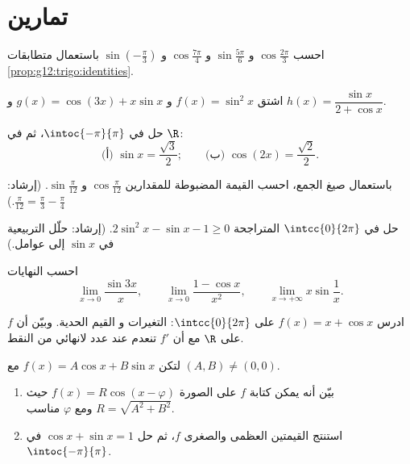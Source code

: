 \section{تمارين}

\begin{exercise}[$\star$]\label{exo:g12:trigo:1}
احسب $\cos\frac{2\pi}{3}$ و $\sin\frac{5\pi}{6}$ و $\cos\frac{7\pi}{4}$ و
$\sin\left(-\frac{\pi}{3}\right)$ باستعمال متطابقات
\cref{prop:g12:trigo:identities}.
\end{exercise}

\begin{exercise}[$\star$]\label{exo:g12:trigo:2}
اشتق $f(x) = \sin^2 x$ و $g(x) = \cos(3x) + x\sin x$ و
$h(x) = \dfrac{\sin x}{2 + \cos x}$.
\end{exercise}

\begin{exercise}[$\star$]\label{exo:g12:trigo:3}
حل في $\intoc{-\pi}{\pi}$، ثم في $\R$:
\[
\text{(أ) } \sin x = \frac{\sqrt3}{2};
\qquad
\text{(ب) } \cos\left(2x\right) = \frac{\sqrt2}{2} .
\]
\end{exercise}

\begin{exercise}[$\star\star$]\label{exo:g12:trigo:4}
باستعمال صيغ الجمع، احسب القيمة المضبوطة للمقدارين
$\cos\frac{\pi}{12}$ و $\sin\frac{\pi}{12}$.
(إرشاد: $\frac{\pi}{12} = \frac{\pi}{3} - \frac{\pi}{4}$.)
\end{exercise}

\begin{exercise}[$\star\star$]\label{exo:g12:trigo:5}
حل في $\intcc{0}{2\pi}$ المتراجحة $2\sin^2 x - \sin x - 1 \geq 0$.
(إرشاد: حلّل التربيعية في $\sin x$ إلى عوامل.)
\end{exercise}

\begin{exercise}[$\star\star$]\label{exo:g12:trigo:6}
احسب النهايات
\[
\lim_{x\to0} \frac{\sin 3x}{x}, \qquad
\lim_{x\to0} \frac{1 - \cos x}{x^2}, \qquad
\lim_{x\to+\infty} x \sin\frac{1}{x}.
\]
\end{exercise}

\begin{exercise}[$\star\star$]\label{exo:g12:trigo:7}
ادرس  $f(x) = x + \cos x$ على $\intcc{0}{2\pi}$: التغيرات و
القيم الحدية. وبيّن أن $f$  على $\R$ مع أن $f'$ تنعدم عند
عدد لانهائي من النقط.
\end{exercise}

\begin{exercise}[$\star\star\star$]\label{exo:g12:trigo:8}
لتكن $f(x) = A\cos x + B \sin x$ مع $(A,B) \neq (0,0)$.
\begin{enumerate}
  \item بيّن أنه يمكن كتابة $f$ على الصورة $f(x) = R\cos(x - \varphi)$ حيث
        $R = \sqrt{A^2 + B^2}$ ومع $\varphi$ مناسب.
  \item استنتج القيمتين العظمى والصغرى  $f$، ثم حل
        $\cos x + \sin x = 1$ في $\intoc{-\pi}{\pi}$.
\end{enumerate}
\end{exercise}


